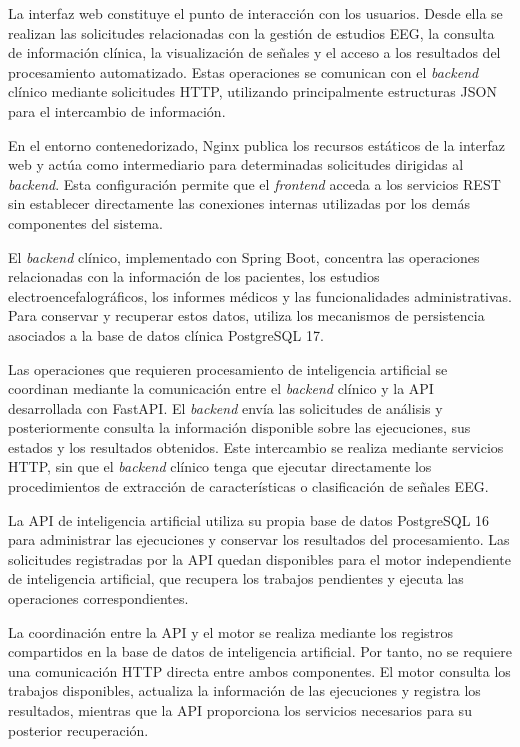 La interfaz web constituye el punto de interacción con
los usuarios. Desde ella se realizan las solicitudes
relacionadas con la gestión de estudios EEG, la consulta
de información clínica, la visualización de señales y
el acceso a los resultados del procesamiento automatizado.
Estas operaciones se comunican con el \textit{backend} clínico
mediante solicitudes HTTP, utilizando principalmente
estructuras JSON para el intercambio de información.

En el entorno contenedorizado, Nginx publica los recursos
estáticos de la interfaz web y actúa como intermediario
para determinadas solicitudes dirigidas al \textit{backend}.
Esta configuración permite que el \textit{frontend} acceda a los
servicios REST sin establecer directamente las conexiones
internas utilizadas por los demás componentes del sistema.

El \textit{backend} clínico, implementado con Spring Boot, concentra
las operaciones relacionadas con la información de los
pacientes, los estudios electroencefalográficos, los
informes médicos y las funcionalidades administrativas.
Para conservar y recuperar estos datos, utiliza los
mecanismos de persistencia asociados a la base de datos
clínica PostgreSQL 17.

Las operaciones que requieren procesamiento de inteligencia
artificial se coordinan mediante la comunicación entre el
\textit{backend} clínico y la API desarrollada con FastAPI. El
\textit{backend} envía las solicitudes de análisis y posteriormente
consulta la información disponible sobre las ejecuciones,
sus estados y los resultados obtenidos. Este intercambio
se realiza mediante servicios HTTP, sin que el \textit{backend}
clínico tenga que ejecutar directamente los procedimientos
de extracción de características o clasificación de
señales EEG.

La API de inteligencia artificial utiliza su propia
base de datos PostgreSQL 16 para administrar las
ejecuciones y conservar los resultados del procesamiento.
Las solicitudes registradas por la API quedan disponibles para el motor
independiente de inteligencia artificial, que recupera
los trabajos pendientes y ejecuta las operaciones
correspondientes.

La coordinación entre la API y el motor se realiza
mediante los registros compartidos en la base de datos
de inteligencia artificial. Por tanto, no se requiere una comunicación HTTP directa entre ambos
componentes. El motor consulta los trabajos disponibles,
actualiza la información de las ejecuciones y registra
los resultados, mientras que la API proporciona los
servicios necesarios para su posterior recuperación.


